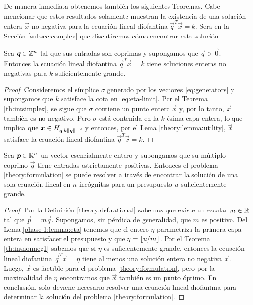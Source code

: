 De manera inmediata obtenemos también los siguientes Teoremas. Cabe mencionar que estos resultados
solamente muestran la existencia de una solución entera $\vec{x}$ no negativa para la ecuación lineal
diofantina $\vec{q}^T\vec{x} = k$. Será en la Sección \ref{subsec:complex} que discutiremos cómo
encontrar esta solución.
\begin{theorem}
	\label{th:intnonneg1}
	Sea $\boldsymbol{q} \in \mathbb{Z}^n$ tal que sus entradas son coprimas y supongamos que $\vec{q} > \vec{0}$.
	Entonces la ecuación lineal diofantina $\vec{q}^T\vec{x} = k$ tiene soluciones enteras no
	negativas para $k$ suficientemente grande.
\end{theorem}
\begin{proof}
	Consideremos el símplice $\sigma$ generado por los vectores \eqref{eq:generators} y supongamos
	que $k$ satisface la cota en \eqref{eq:eta-limit}. Por el Teorema \ref{th:intsimplex}, se sigue
	que $\sigma$ contiene un punto entero $\vec{x}$ y, por lo tanto, $\vec{x}$ también es no
	negativo. Pero $\sigma$ está contenida en la $k$-ésima capa entera, lo que implica que $\boldsymbol{x}
	\in H_{\boldsymbol{q}, k\left\lVert \boldsymbol{q} \right\rVert^{-2}}$ y entonces, por el Lema \ref{theory:lemma:utility},
	$\vec{x}$ satisface la ecuación lineal diofantina $\vec{q}^T\vec{x} = k$.
\end{proof}
\begin{theorem}
	Sea $\boldsymbol{p} \in \mathbb{R}^n$ un vector esencialmente entero y supongamos que su múltiplo coprimo
	$\vec{q}$ tiene entradas estrictamente positivas. Entonces el problema
	\eqref{theory:formulation} se puede resolver a través de encontrar la solución de una sola
	ecuación lineal en $n$ incógnitas para un presupuesto $u$ suficientemente grande.
\end{theorem}
\begin{proof}
	Por la Definición \ref{theory:def:rational} sabemos que existe un escalar $m \in \mathbb{R}$ tal que
	$\vec{p} = m\vec{q}$. Supongamos, sin pérdida de generalidad, que $m$ es positivo. Del Lema
	\ref{phase-1:lemma:eta} tenemos que el entero $\eta$ parametriza la primera capa entera en
	satisfacer el presupuesto y que $\eta = \left\lfloor u/m \right\rfloor$. Por el Teorema \ref{th:intnonneg1} sabemos
	que si $\eta$ es suficientemente grande, entonces la ecuación lineal diofantina
	$\vec{q}^T\vec{x} = \eta$ tiene al menos una solución entera no negativa $\vec{x}$. Luego,
	$\vec{x}$ es factible para el problema \eqref{theory:formulation}, pero por la maximalidad de
	$\eta$ encontramos que $\vec{x}$ también es un punto óptimo. En conclusión, solo deviene
	necesario resolver una ecuación lineal diofantina para determinar la solución del problema
	\eqref{theory:formulation}.
\end{proof}

